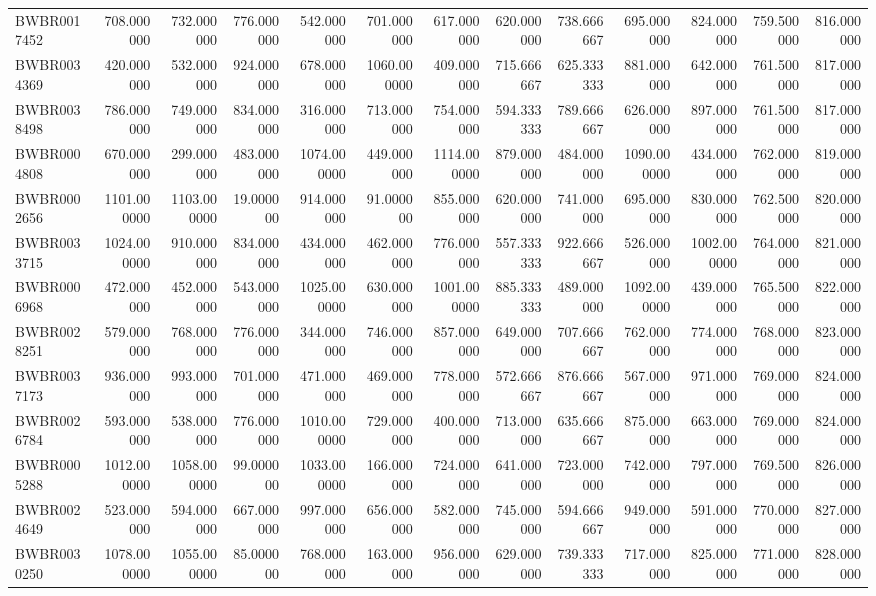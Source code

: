 \begin{longtable}{lrrrrrrrrrrrr}
BWBR0017452 & 708.000000 & 732.000000 & 776.000000 & 542.000000 & 701.000000 & 617.000000 & 620.000000 & 738.666667 & 695.000000 & 824.000000 & 759.500000 & 816.000000 \\
BWBR0034369 & 420.000000 & 532.000000 & 924.000000 & 678.000000 & 1060.000000 & 409.000000 & 715.666667 & 625.333333 & 881.000000 & 642.000000 & 761.500000 & 817.000000 \\
BWBR0038498 & 786.000000 & 749.000000 & 834.000000 & 316.000000 & 713.000000 & 754.000000 & 594.333333 & 789.666667 & 626.000000 & 897.000000 & 761.500000 & 817.000000 \\
BWBR0004808 & 670.000000 & 299.000000 & 483.000000 & 1074.000000 & 449.000000 & 1114.000000 & 879.000000 & 484.000000 & 1090.000000 & 434.000000 & 762.000000 & 819.000000 \\
BWBR0002656 & 1101.000000 & 1103.000000 & 19.000000 & 914.000000 & 91.000000 & 855.000000 & 620.000000 & 741.000000 & 695.000000 & 830.000000 & 762.500000 & 820.000000 \\
BWBR0033715 & 1024.000000 & 910.000000 & 834.000000 & 434.000000 & 462.000000 & 776.000000 & 557.333333 & 922.666667 & 526.000000 & 1002.000000 & 764.000000 & 821.000000 \\
BWBR0006968 & 472.000000 & 452.000000 & 543.000000 & 1025.000000 & 630.000000 & 1001.000000 & 885.333333 & 489.000000 & 1092.000000 & 439.000000 & 765.500000 & 822.000000 \\
BWBR0028251 & 579.000000 & 768.000000 & 776.000000 & 344.000000 & 746.000000 & 857.000000 & 649.000000 & 707.666667 & 762.000000 & 774.000000 & 768.000000 & 823.000000 \\
BWBR0037173 & 936.000000 & 993.000000 & 701.000000 & 471.000000 & 469.000000 & 778.000000 & 572.666667 & 876.666667 & 567.000000 & 971.000000 & 769.000000 & 824.000000 \\
BWBR0026784 & 593.000000 & 538.000000 & 776.000000 & 1010.000000 & 729.000000 & 400.000000 & 713.000000 & 635.666667 & 875.000000 & 663.000000 & 769.000000 & 824.000000 \\
BWBR0005288 & 1012.000000 & 1058.000000 & 99.000000 & 1033.000000 & 166.000000 & 724.000000 & 641.000000 & 723.000000 & 742.000000 & 797.000000 & 769.500000 & 826.000000 \\
BWBR0024649 & 523.000000 & 594.000000 & 667.000000 & 997.000000 & 656.000000 & 582.000000 & 745.000000 & 594.666667 & 949.000000 & 591.000000 & 770.000000 & 827.000000 \\
BWBR0030250 & 1078.000000 & 1055.000000 & 85.000000 & 768.000000 & 163.000000 & 956.000000 & 629.000000 & 739.333333 & 717.000000 & 825.000000 & 771.000000 & 828.000000 \\

\end{longtable}
